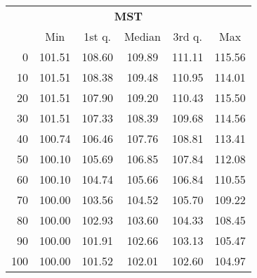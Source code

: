 \begin{tabular}{r|ccccc}
  \multicolumn{6}{c}{{\bf MST}} \\
  & Min & 1st q. & Median & 3rd q. & Max \\ \hline\hline
  0 & 101.51 & 108.60 & 109.89 & 111.11 & 115.56
\\ 10 & 101.51 & 108.38 & 109.48 & 110.95 & 114.01
\\ 20 & 101.51 & 107.90 & 109.20 & 110.43 & 115.50
\\ 30 & 101.51 & 107.33 & 108.39 & 109.68 & 114.56
\\ 40 & 100.74 & 106.46 & 107.76 & 108.81 & 113.41
\\ 50 & 100.10 & 105.69 & 106.85 & 107.84 & 112.08
\\ 60 & 100.10 & 104.74 & 105.66 & 106.84 & 110.55
\\ 70 & 100.00 & 103.56 & 104.52 & 105.70 & 109.22
\\ 80 & 100.00 & 102.93 & 103.60 & 104.33 & 108.45
\\ 90 & 100.00 & 101.91 & 102.66 & 103.13 & 105.47
\\ 100 & 100.00 & 101.52 & 102.01 & 102.60 & 104.97
\end{tabular}
